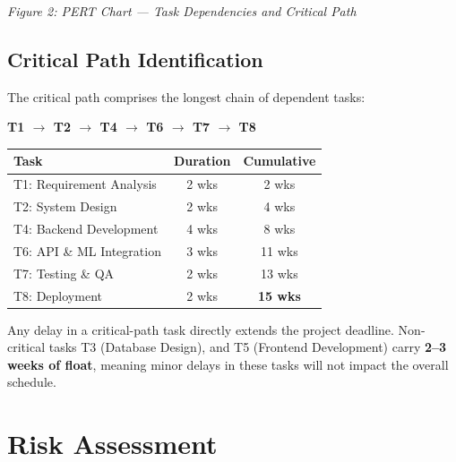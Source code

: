 \documentclass[12pt,a4paper]{article}
\begin{document}
\begin{center}
\small\textit{Figure 2: PERT Chart --- Task Dependencies and Critical Path}
\end{center}

\subsection{Critical Path Identification}
The critical path comprises the longest chain of dependent tasks:

\begin{center}
\textcolor{critical}{\textbf{T1 $\rightarrow$ T2 $\rightarrow$ T4 $\rightarrow$ T6 $\rightarrow$ T7 $\rightarrow$ T8}}
\end{center}

\begin{center}
\begin{tabular}{lcc}
\toprule
\textbf{Task} & \textbf{Duration} & \textbf{Cumulative} \\
\midrule
T1: Requirement Analysis & 2 wks & 2 wks \\
T2: System Design & 2 wks & 4 wks \\
T4: Backend Development & 4 wks & 8 wks \\
T6: API \& ML Integration & 3 wks & 11 wks \\
T7: Testing \& QA & 2 wks & 13 wks \\
T8: Deployment & 2 wks & \textbf{15 wks} \\
\bottomrule
\end{tabular}
\end{center}

\noindent Any delay in a critical-path task directly extends the project deadline. Non-critical tasks T3 (Database Design), and T5 (Frontend Development) carry \textbf{2--3 weeks of float}, meaning minor delays in these tasks will not impact the overall schedule.

\section{Risk Assessment}
\end{document}
